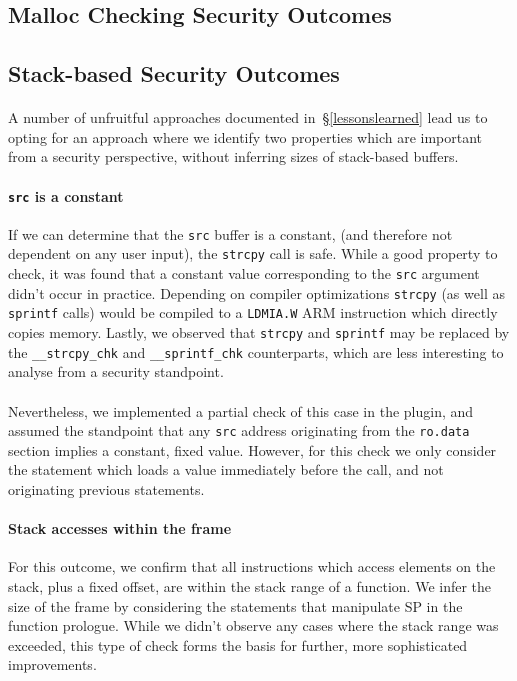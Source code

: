 \documentclass[letterpaper,11pt]{article}
\begin{document}
\subsection{Malloc Checking Security Outcomes}

\subsection{Stack-based Security Outcomes}
\label{stackoutcomes}

\paragraph{}
A number of unfruitful approaches documented in~\S\ref{lessonslearned} lead us
to opting for an approach where we identify two properties which are important
from a security perspective, without inferring sizes of stack-based buffers.

\paragraph{\texttt{src} is a constant}
If we can determine that the \texttt{src} buffer is a constant, (and therefore
not dependent on any user input), the \texttt{strcpy} call is safe. While a
good property to check, it was found that a constant value corresponding to the
\texttt{src} argument didn't occur in practice. Depending on compiler
optimizations \texttt{strcpy} (as well as \texttt{sprintf} calls) would be
compiled to a \texttt{LDMIA.W} ARM instruction which directly copies memory.
Lastly, we observed that \texttt{strcpy} and \texttt{sprintf} may be replaced
by the \texttt{\_\_strcpy\_chk} and \texttt{\_\_sprintf\_chk} counterparts,
which are less interesting to analyse from a security standpoint.

\paragraph{}
Nevertheless, we implemented a partial check of this case in the plugin, and
assumed the standpoint that any \texttt{src} address originating from the
\texttt{ro.data} section implies a constant, fixed value. However, for this
check we only consider the statement which loads a value immediately before the
call, and not originating previous statements. %

\paragraph{Stack accesses within the frame}
For this outcome, we confirm that all instructions which access elements on
the stack, plus a fixed offset, are within the stack range of a function. We
infer the size of the frame by considering the statements that manipulate
SP in the function prologue. While we didn't observe any cases where the
stack range was exceeded, this type of check forms the basis for further,
more sophisticated improvements.
\end{document}
